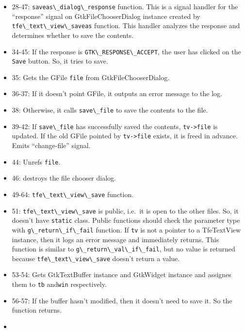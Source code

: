 \begin{itemize}
\item
  28-47: \passthrough{\lstinline!saveas\_dialog\_response!} function.
  This is a signal handler for the ``response'' signal on
  GtkFileChooserDialog instance created by
  \passthrough{\lstinline!tfe\_text\_view\_saveas!} function. This
  handler analyzes the response and determines whether to save the
  contents.
\item
  34-45: If the response is
  \passthrough{\lstinline!GTK\_RESPONSE\_ACCEPT!}, the user has clicked
  on the \passthrough{\lstinline!Save!} button. So, it tries to save.
\item
  35: Gets the GFile \passthrough{\lstinline!file!} from
  GtkFileChooserDialog.
\item
  36-37: If it doesn't point GFile, it outputs an error message to the
  log.
\item
  38: Otherwise, it calls \passthrough{\lstinline!save\_file!} to save
  the contents to the file.
\item
  39-42: If \passthrough{\lstinline!save\_file!} has successfully saved
  the contents, \passthrough{\lstinline!tv->file!} is updated. If the
  old GFile pointed by \passthrough{\lstinline!tv->file!} exists, it is
  freed in advance. Emits ``change-file'' signal.
\item
  44: Unrefs \passthrough{\lstinline!file!}.
\item
  46: destroys the file chooser dialog.
\item
  49-64: \passthrough{\lstinline!tfe\_text\_view\_save!} function.
\item
  51: \passthrough{\lstinline!tfe\_text\_view\_save!} is public, i.e.~it
  is open to the other files. So, it doesn't have
  \passthrough{\lstinline!static!} class. Public functions should check
  the parameter type with \passthrough{\lstinline!g\_return\_if\_fail!}
  function. If \passthrough{\lstinline!tv!} is not a pointer to a
  TfeTextView instance, then it logs an error message and immediately
  returns. This function is similar to
  \passthrough{\lstinline!g\_return\_val\_if\_fail!}, but no value is
  returned because \passthrough{\lstinline!tfe\_text\_view\_save!}
  doesn't return a value.
\item
  53-54: Gets GtkTextBuffer instance and GtkWidget instance and assignes
  them to \passthrough{\lstinline!tb!} and\passthrough{\lstinline!win!}
  respectively.
\item
  56-57: If the buffer hasn't modified, then it doesn't need to save it.
  So the function returns.
\item

\end{itemize}
